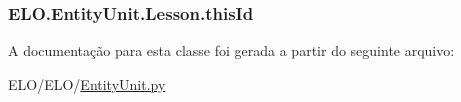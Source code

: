\hypertarget{classELO_1_1EntityUnit_1_1Lesson_a2ec9bd43b6b7ac7c7d00469c9f586271}{
\subsubsection[{this\-Id}]{\setlength{\rightskip}{0pt plus 5cm}E\-L\-O.\-Entity\-Unit.\-Lesson.\-this\-Id}}\label{dc/d13/classELO_1_1EntityUnit_1_1Lesson_a2ec9bd43b6b7ac7c7d00469c9f586271}


A documentação para esta classe foi gerada a partir do seguinte arquivo\-:\begin{DoxyCompactItemize}
\item 
E\-L\-O/\-E\-L\-O/\hyperlink{EntityUnit_8py}{Entity\-Unit.\-py}\end{DoxyCompactItemize}
